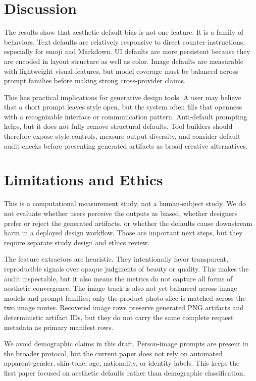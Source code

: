 \documentclass[10pt]{article}
\begin{document}
\section{Discussion}

The results show that aesthetic default bias is not one feature. It is a family of behaviors. Text defaults are relatively responsive to direct counter-instructions, especially for emoji and Markdown. UI defaults are more persistent because they are encoded in layout structure as well as color. Image defaults are measurable with lightweight visual features, but model coverage must be balanced across prompt families before making strong cross-provider claims.

This has practical implications for generative design tools. A user may believe that a short prompt leaves style open, but the system often fills that openness with a recognizable interface or communication pattern. Anti-default prompting helps, but it does not fully remove structural defaults. Tool builders should therefore expose style controls, measure output diversity, and consider default-audit checks before presenting generated artifacts as broad creative alternatives.

\section{Limitations and Ethics}

This is a computational measurement study, not a human-subject study. We do not evaluate whether users perceive the outputs as biased, whether designers prefer or reject the generated artifacts, or whether the defaults cause downstream harm in a deployed design workflow. Those are important next steps, but they require separate study design and ethics review.

The feature extractors are heuristic. They intentionally favor transparent, reproducible signals over opaque judgments of beauty or quality. This makes the audit inspectable, but it also means the metrics do not capture all forms of aesthetic convergence. The image track is also not yet balanced across image models and prompt families; only the product-photo slice is matched across the two image routes. Recovered image rows preserve generated PNG artifacts and deterministic artifact IDs, but they do not carry the same complete request metadata as primary manifest rows.

We avoid demographic claims in this draft. Person-image prompts are present in the broader protocol, but the current paper does not rely on automated apparent-gender, skin-tone, age, nationality, or identity labels. This keeps the first paper focused on aesthetic defaults rather than demographic classification.
\end{document}
